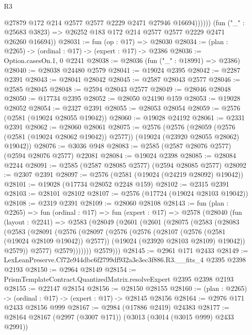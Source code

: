 \begin{lexlean}{R3}
\begin{coremodule}
                @27879 @172 @214 @2577 @2577 @2229 @2471 @27946 @16694))))))
      (fun ("_" : @25683 @3823) => @26252 @183 @172 @214 @2577 @2577 @2229 @2471 @26260 @16694))
@28031 := fun (op : @17) => @28030
@28034 := (plan : @2265) -> (ordinal : @17) -> (expert : @17) -> @2386
@28036 := Option.casesOn.{1, 0} @2241
@28038 := @28036 (fun ("_" : @18991) => @2386)
@28040 := @28038 @24480 @2579
@28041 := @19024 @2395
@28042 := @2287 @2391
@28043 := @28041 @28042
@28045 := @2587 @28043 @2577
@28046 := @2585 @28045
@28048 := @2594 @28043 @2577
@28049 := @28046 @28048
@28050 := @17734 @2395
@28052 := @28050 @24190 @159
@28053 := @19028 @28052
@28054 := @2327 @2391
@28055 := @28053 @28054
@28059 := @2576 (@2581 (@19024 @28055 @19042))
@28060 := @19028 @24192
@28061 := @2331 @2391
@28062 := @28060 @28061
@28075 := @2576
    (@2576
      (@28059 (@2576 (@2581 (@19024 @28062 @19042)) @2577))
      (@19024 (@23920 @28055 @28062) @19042))
@28076 := @3036 @948
@28083 := @2585 (@2587 @28076 @2577) (@2594 @28076 @2577) @22081
@28084 := @19024 @2398
@28085 := @28084 @2244
@28091 := @2585 (@2587 @28085 @2577) (@2594 @28085 @2577)
@28092 := @2307 @2391
@28097 := @2576 (@2581 (@19024 (@24219 @28092) @19042))
@28101 := @19028 (@17734 @28052 @2248 @159)
@28102 := @2315 @2391
@28103 := @28101 @28102
@28107 := @2576 (@17724 (@19024 @28103 @19042))
@28108 := @2319 @2391
@28109 := @28060 @28108
@28143 := fun (plan : @2265) =>
  fun (ordinal : @17) =>
  fun (expert : @17) =>
  @2578
    (@28040
      (fun (layout : @2241) =>
      @2583
        (@28049
          (@2601
            (@2601
              (@28075
                (@2583
                  (@28083
                    (@2583
                      (@28091
                        (@2576
                          (@28097
                            (@2576
                              (@2576
                                (@28107 (@2576 (@2581 (@19024 @28109 @19042)) @2577))
                                (@19024 (@23920 @28103 @28109) @19042))
                              @2579))
                          @2577)
                        @2579)))))))
          @2579)))
@28145 := @2961 @171 @2433
@28149 := LexLeanPreserve.Cf72e944dbc6f2799df932a3e3ec3f886.R3.__fits_4 @2395 @2398 @2193
@28150 := @2964 @28149
@28154 := PrismTemplateContract.QuantizedMatrix.resolveExpert @2395 @2398 @2193
@28155 := @22147 @28154
@28156 := @28150 @28155
@28160 := (plan : @2265) -> (ordinal : @17) -> (expert : @17) -> @28145 @28156
@28164 := @2976 @171 @2433 @28156 @999
@28167 := @2984 (@17886 @2419) @24383
@28177 := @28164 @28167 (@2997 (@3007 @171)) (@3013 (@3014 (@3015 @999) @2433 @2991))

\end{coremodule}
\end{lexlean}
